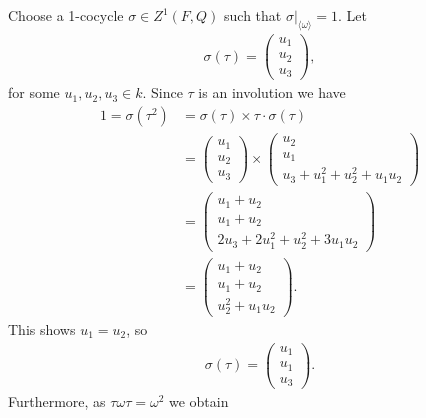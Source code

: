 Choose a 1-cocycle $\sigma \in Z^1(F, Q)$ such that $\sigma|_{\langle \omega \rangle} = 1$. Let
\begin{align*}
	\sigma(\tau) = \left(\begin{matrix} u_1 \\ u_2 \\ u_3 \end{matrix} \right),
\end{align*}
for some $u_1, u_2, u_3 \in k$. Since $\tau$ is an involution we have
\begin{align*}
	1 = \sigma(\tau^2) &= \sigma(\tau) \times \tau\cdot\sigma(\tau)\\
	&= \left(\begin{matrix} u_1 \\ u_2 \\ u_3\end{matrix} \right) \times 
	\left(\begin{matrix} u_2 \\ u_1 \\ u_3 + u_1^2 + u_2^2 + u_1u_2\end{matrix} \right) \\
	&= \left(\begin{matrix} u_1 + u_2 \\ u_1 + u_2 \\ 2u_3 + 2u_1^2 + u_2^2 + 3u_1u_2\end{matrix} \right)\\
	&= \left(\begin{matrix} u_1 + u_2 \\ u_1 + u_2 \\ u_2^2 + u_1u_2\end{matrix} \right).
\end{align*}
This shows $u_1 = u_2$, so
\begin{align*}
	\sigma(\tau) = \left(\begin{matrix} u_1 \\ u_1 \\ u_3\end{matrix} \right).
\end{align*}
Furthermore, as $\tau\omega\tau = \omega^2$ we obtain
